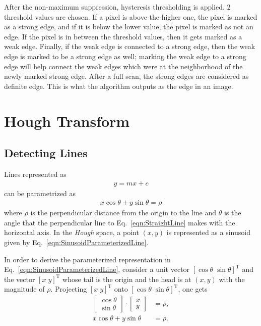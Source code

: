 \documentclass{report}
\begin{document}
After the non-maximum suppression, hysteresis thresholding is applied. $2$ threshold values are chosen. If a pixel is above the higher one, the pixel is marked as a strong edge, and if it is below the lower value, the pixel is marked as not an edge. If the pixel is in between the threshold values, then it gets marked as a weak edge. Finally, if the weak edge is connected to a strong edge, then the weak edge is marked to be a strong edge as well; marking the weak edge to a strong edge will help connect the weak edges which were at the neighborhood of the newly marked strong edge. After a full scan, the strong edges are considered as definite edge. This is what the algorithm outputs as the edge in an image.

\section{Hough Transform}
\subsection{Detecting Lines}
\hspace{\parindent}Lines represented as 
\begin{align}
	y = mx + c
	\label{eqn:StraightLine}
\end{align}
can be parametrized as
\begin{align}
	x \cos{\theta} + y \sin{\theta} = \rho
	\label{eqn:SinusoidParameterizedLine}
\end{align}
where $\rho$ is the perpendicular distance from the origin to the line and $\theta$ is the angle that the perpendicular line to Eq.~\ref{eqn:StraightLine} makes with the horizontal axis. In the \textit{Hough} space, a point $(x,y)$ is represented as a sinusoid given by Eq.~\ref{eqn:SinusoidParameterizedLine}.

In order to derive the parameterized representation in Eq.~\ref{eqn:SinusoidParameterizedLine}, consider a unit vector $[ \cos{\theta} \; \sin{\theta} ]^\text{T}$ and the vector $[x \; y]^{\text{T}}$ whose tail is the origin and the head is at $(x,y)$ with the magnitude of $\rho$. Projecting $[x \; y]^{\text{T}}$ onto $[ \cos{\theta} \; \sin{\theta} ]^\text{T}$, one gets
\begin{align}
	\begin{bmatrix}
		\cos{\theta} \\
		\sin{\theta}
	\end{bmatrix}
	\cdot
	\begin{bmatrix}
		x \\
		y
	\end{bmatrix}
	& = \rho, \\
	x \cos{\theta} + y \sin{\theta} & = \rho.
	\label{eqn:SinusoidParameterizedLineDerivation}
\end{align}
\end{document}
